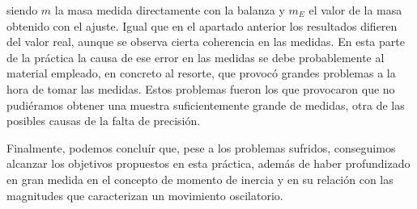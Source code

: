 \documentclass[a4paper,12pt,titlepage]{report}
\begin{document}
siendo $m$ la masa medida directamente con la balanza y $m_E$ el valor de la masa obtenido con el ajuste. Igual que en el apartado anterior los resultados difieren del valor real, aunque se observa cierta coherencia en las medidas. En esta parte de la práctica la causa de ese error en las medidas se debe probablemente al material empleado, en concreto al resorte, que provocó grandes problemas a la hora de tomar las medidas. Estos problemas fueron los que provocaron que no pudiéramos obtener una muestra suficientemente grande de medidas, otra de las posibles causas de la falta de precisión.

\par Finalmente, podemos concluír que, pese a los problemas sufridos, conseguimos alcanzar los objetivos propuestos en esta práctica, además de haber profundizado en gran medida en el concepto de momento de inercia y en su relación con las magnitudes que caracterizan un movimiento oscilatorio.
\end{document}
